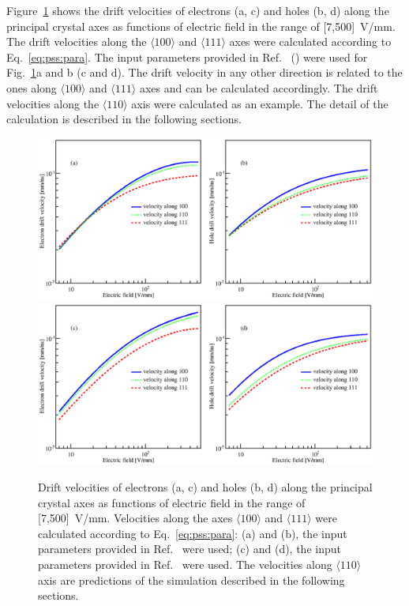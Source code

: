Figure~\ref{fig:pss:vvse} shows the drift velocities of electrons (a, c) and holes (b, d) along the principal crystal axes as functions of electric field in the range of [7,500]~V/mm. The drift velocities along the $\langle 100 \rangle$ and $\langle 111 \rangle$ axes were calculated according to Eq.~\ref{eq:pss:para}. The input parameters provided in Ref.~\cite{miha} (\cite{bart}) were used for Fig.~\ref{fig:pss:vvse}a and b (c and d). The drift velocity in any other direction is related to the ones along $\langle 100 \rangle$ and $\langle 111 \rangle$ axes and can be calculated accordingly. The drift velocities along the $\langle 110 \rangle$ axis were calculated as an example. The detail of the calculation is described in the following sections.

\begin{figure}[tbhp]
\centering
\includegraphics[width=\textwidth]{VvsElucian} \\\hfil
\includegraphics[width=\textwidth]{VvsEbart}
\caption{Drift velocities of electrons (a, c) and holes (b, d) along the principal crystal axes as functions of electric field in the range of [7,500]~V/mm. Velocities along the axes $\langle 100 \rangle$ and $\langle 111 \rangle$ were calculated according to Eq.~\ref{eq:pss:para}: (a) and (b), the input parameters provided in Ref.~\cite{miha} were used; (c) and (d), the input parameters provided in Ref.~\cite{bart} were used. The velocities along $\langle 110 \rangle$ axis are predictions of the simulation described in the following sections.}
\label{fig:pss:vvse}
\end{figure}

